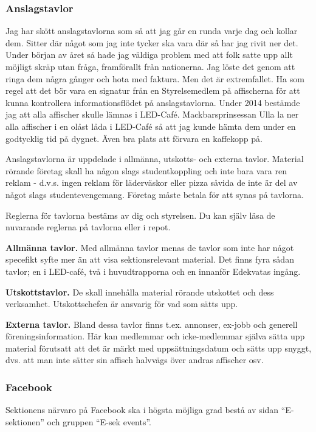 \documentclass[10pt]{article}
\begin{document}
\subsubsection{Anslagstavlor}
Jag har skött anslagstavlorna som så att jag går en runda varje dag och kollar dem. Sitter där något som jag inte tycker ska vara där så har jag rivit ner det. Under början av året så hade jag väldiga problem med att folk satte upp allt möjligt skräp utan fråga, framförallt från nationerna. Jag löste det genom att ringa dem några gånger och hota med faktura. Men det är extremfallet. Ha som regel att det bör vara en signatur från en Styrelsemedlem på affischerna för att kunna kontrollera informationsflödet på anslagstavlorna. Under 2014 bestämde jag att alla affischer skulle lämnas i LED-Café.  Mackbarsprinsessan Ulla la ner alla affischer i en olåst låda i LED-Café så att jag kunde hämta dem under en godtycklig tid på dygnet. Även bra plats att förvara en kaffekopp på.

Anslagstavlorna är uppdelade i allmänna, utskotts- och externa tavlor. Material rörande företag skall ha någon slags studentkoppling och inte bara vara ren reklam - d.v.s. ingen reklam för läderväskor eller pizza såvida de inte är del av något slags studentevengemang. Företag måste betala för att synas på tavlorna.

Reglerna för tavlorna bestäms av dig och styrelsen. Du kan själv läsa de nuvarande reglerna på tavlorna eller i repot.

\textbf{Allmänna tavlor.} Med allmänna tavlor menas de tavlor som inte har något specefikt syfte mer än att visa sektionsrelevant material. Det finns fyra sådan tavlor; en i LED-café, två i huvudtrapporna och en innanför Edekvatas ingång.

\textbf{Utskottstavlor.} De skall innehålla material rörande utskottet och dess verksamhet. Utskottschefen är ansvarig för vad som sätts upp.

\textbf{Externa tavlor.} Bland dessa tavlor finns t.ex. annonser, ex-jobb och generell föreningsinformation. Här kan medlemmar och icke-medlemmar själva sätta upp material förutsatt att det är märkt med uppsättningsdatum och sätts upp snyggt, dvs. att man inte sätter sin affisch halvvägs över andras affischer osv.

\subsubsection{Facebook}
Sektionens närvaro på Facebook ska i högsta möjliga grad bestå av sidan ``E-sektionen'' och gruppen ``E-sek events''.
\end{document}
